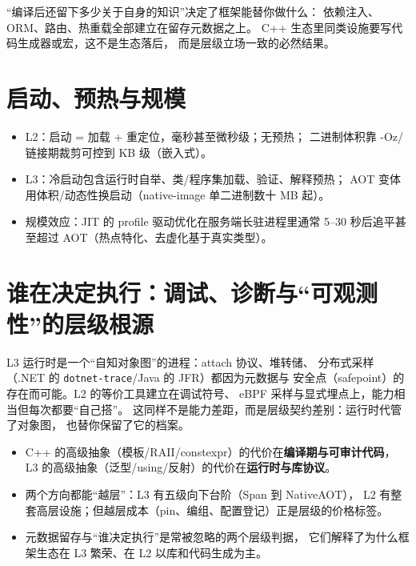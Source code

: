 \documentclass[12pt,a4paper,fontset=fandol]{ctexbook}
\begin{document}
``编译后还留下多少关于自身的知识''决定了框架能替你做什么：
依赖注入、ORM、路由、热重载全部建立在留存元数据之上。
C++ 生态里同类设施要写代码生成器或宏，这不是生态落后，
而是层级立场一致的必然结果。

\section{启动、预热与规模}

\begin{itemize}
  \item L2：启动 = 加载 + 重定位，毫秒甚至微秒级；无预热；
        二进制体积靠 -Oz/链接期裁剪可控到 KB 级（嵌入式）。
  \item L3：冷启动包含运行时自举、类/程序集加载、验证、解释预热；
        AOT 变体用体积/动态性换启动（native-image 单二进制数十 MB 起）。
  \item 规模效应：JIT 的 profile 驱动优化在服务端长驻进程里通常
        5--30 秒后追平甚至超过 AOT（热点特化、去虚化基于真实类型）。
\end{itemize}

\section{谁在决定执行：调试、诊断与``可观测性''的层级根源}

L3 运行时是一个``自知对象图''的进程：attach 协议、堆转储、
分布式采样（.NET 的 \texttt{dotnet-trace}/Java 的 JFR）都因为元数据与
安全点（safepoint）的存在而可能。L2 的等价工具建立在调试符号、
eBPF 采样与显式埋点上，能力相当但每次都要``自己搭''。
这同样不是能力差距，而是层级契约差别：运行时代管了对象图，
也替你保留了它的档案。

\begin{guideline}[title=Part III 小结]
\begin{itemize}
  \item C++ 的高级抽象（模板/RAII/constexpr）的代价在\textbf{编译期与可审计代码}，
        L3 的高级抽象（泛型/using/反射）的代价在\textbf{运行时与库协议}。
  \item 两个方向都能``越层''：L3 有五级向下台阶（Span 到 NativeAOT），
        L2 有整套高层设施；但越层成本（pin、编组、配置登记）正是层级的价格标签。
  \item 元数据留存与``谁决定执行''是常被忽略的两个层级判据，
        它们解释了为什么框架生态在 L3 繁荣、在 L2 以库和代码生成为主。
\end{itemize}
\end{guideline}
\end{document}

